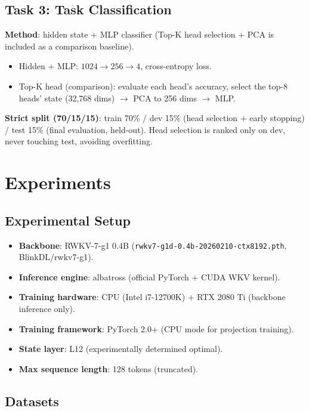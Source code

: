 \documentclass[11pt]{article}
\begin{document}
\subsection{Task 3: Task Classification}
\label{sec:classification-method}

\textbf{Method}: hidden state + MLP classifier (Top-K head selection + PCA
is included as a comparison baseline).
\begin{itemize}
  \item Hidden + MLP: $1024 \to 256 \to 4$, cross-entropy loss.
  \item Top-K head (comparison): evaluate each head's accuracy, select the
  top-8 heads' state (32,768 dims) $\to$ PCA to 256 dims $\to$ MLP.
\end{itemize}

\textbf{Strict split (70/15/15)}: train 70\% / dev 15\% (head selection +
early stopping) / test 15\% (final evaluation, held-out). Head selection is
ranked only on dev, never touching test, avoiding overfitting.

\section{Experiments}

\subsection{Experimental Setup}

\begin{itemize}
  \item \textbf{Backbone}: RWKV-7-g1 0.4B
  (\texttt{rwkv7-g1d-0.4b-20260210-ctx8192.pth}, BlinkDL/rwkv7-g1).
  \item \textbf{Inference engine}: albatross (official PyTorch + CUDA WKV
  kernel).
  \item \textbf{Training hardware}: CPU (Intel i7-12700K) + RTX 2080 Ti
  (backbone inference only).
  \item \textbf{Training framework}: PyTorch 2.0+ (CPU mode for projection
  training).
  \item \textbf{State layer}: L12 (experimentally determined optimal).
  \item \textbf{Max sequence length}: 128 tokens (truncated).
\end{itemize}

\subsection{Datasets}
\end{document}
